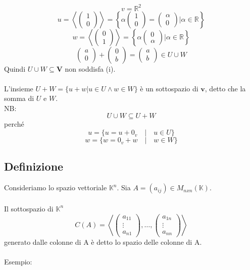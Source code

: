 \documentclass[12pt]{article}
\begin{document}
\[v = \mathbb{R}^2\]
\[u = \left<\begin{pmatrix}
    1\\
    0
\end{pmatrix}\right> = \left\{\alpha \begin{pmatrix}
    1\\
    0
\end{pmatrix} = \begin{pmatrix}
    \alpha\\
    0
\end{pmatrix} | \alpha \in \mathbb{R}\right\}\]
\[w = \left<\begin{pmatrix}
    0\\
    1
\end{pmatrix}\right> = \left\{\alpha \begin{pmatrix}
    0\\
    \alpha
\end{pmatrix} | \alpha \in \mathbb{R}\right\}\]
\[\begin{pmatrix}
    a\\
    0
\end{pmatrix} + \begin{pmatrix}
    0\\
    b
\end{pmatrix} = \begin{pmatrix}
    a\\
    b
\end{pmatrix} \in U \cup W\]
Quindi $U \cup W \subseteq \mathbf{V}$ non soddisfa (i).
\\\\
L'insieme $U + W = \{u+w | u \in U \land w \in W\}$ è un sottospazio di $\mathbf{v}$, detto che la somma di $U$ e $W$.
\\
NB: \[U \cup W \subseteq U+W\] perché
\[u = \{u = u + 0_v \quad | \quad  u \in U\}\]
\[w = \{w = 0_v + w \quad | \quad  w \in W\}\]

\subsection{Definizione}

Consideriamo lo spazio vettoriale $\mathbb{K}^n$. Sia $A = (a_{ij}) \in M_{nxn} (\mathbb{K})$.
\\\\
Il sottospazio di $\mathbb{K}^n$
\[C(A) = \left<  \begin{pmatrix}
    a_{11}\\
    \vdots\\
    a_{n1}
\end{pmatrix}, \dots, \begin{pmatrix}
    a_{1n}\\
    \vdots\\
    a_{nn}
\end{pmatrix}\right>\]
generato dalle colonne di A è detto lo spazio delle colonne di A.
\\\\
Esempio:
\end{document}
